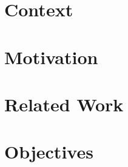 \section{Context}


\section{Motivation}


\section{Related Work}


\section{Objectives}

\label{section:objectives}

